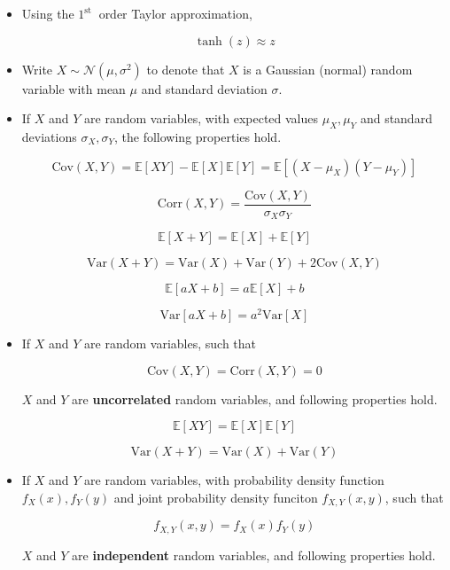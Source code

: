 \begin{concept}
    \begin{itemize}
        \item
        Using the $1^{\text {st }}$ order Taylor approximation,

        $$
        \tanh (z) \approx z
        $$
        \item Write $X \sim \mathcal{N}\left(\mu, \sigma^{2}\right)$ to denote that $X$ is a Gaussian (normal) random variable with mean $\mu$ and standard deviation $\sigma$.
        \item
        If $X$ and $Y$ are random variables, with expected values $\mu_X, \mu_Y$ and standard deviations $\sigma_X, \sigma_Y$, the following properties hold.

        $$
        \text{Cov}(X, Y) = \mathbb{E}[XY] - \mathbb{E}[X]\mathbb{E}[Y] = \mathbb{E}[(X-\mu_X)(Y-\mu_Y)]
        $$

        $$
        \text{Corr}(X, Y) = \frac{\text{Cov}(X, Y)}{\sigma_X \sigma_Y}
        $$

        $$
        \mathbb{E}[X+Y] = \mathbb{E}[X] + \mathbb{E}[Y]
        $$

        $$
        \text{Var}(X+Y) = \text{Var}(X) + \text{Var}(Y) + 2\text{Cov}(X, Y)
        $$

        $$
        \mathbb{E}[aX+b] = a\mathbb{E}[X] + b
        $$

        $$
        \text{Var}[aX+b] = a^2 \text{Var}[X]
        $$
        \item
        If $X$ and $Y$ are random variables, such that

        $$
        \text{Cov}(X, Y)=\text{Corr}(X, Y)=0
        $$

        $X$ and $Y$ are \textbf{uncorrelated} random variables, and following properties hold.

        $$
        \mathbb{E}[XY] = \mathbb{E}[X] \mathbb{E}[Y]
        $$

        $$
        \text{Var}(X+Y) = \text{Var}(X) + \text{Var}(Y)
        $$
        \item
        If $X$ and $Y$ are random variables, with probability density function $f_X(x), f_Y(y)$ and joint probability density funciton $f_{X, Y}(x, y)$, such that

        $$
        f_{X, Y}(x, y) = f_X(x)f_Y(y)
        $$

        $X$ and $Y$ are \textbf{independent} random variables, and following properties hold.


\end{itemize}
\end{concept}
